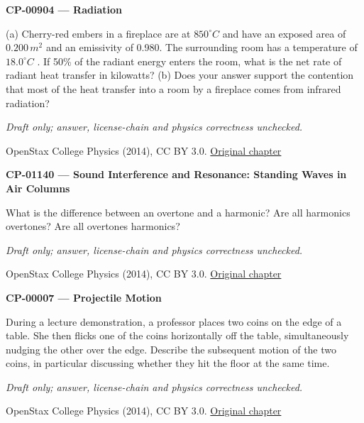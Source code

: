 \par\medskip
\noindent\textbf{CP-00904 — Radiation}
\par (a) Cherry-red embers in a fireplace are at $850^{\circ}C$ and have an exposed area of $0.200\,{m}^{2}$ and an emissivity of 0.980. The surrounding room has a temperature of $18.0^{\circ}C$ . If 50\% of the radiant energy enters the room, what is the net rate of radiant heat transfer in kilowatts? (b) Does your answer support the contention that most of the heat transfer into a room by a fireplace comes from infrared radiation?
\par\smallskip
\textit{Draft only; answer, license-chain and physics correctness unchecked.}
\par{\footnotesize OpenStax College Physics (2014), CC BY 3.0. \href{https://github.com/philschatz/physics-book/blob/a7efaa7e221fab1694022d8bb98b83a73ee31d3d/contents/m42230.md}{Original chapter}}\par\normalsize

\par\medskip
\noindent\textbf{CP-01140 — Sound Interference and Resonance: Standing Waves in Air Columns}
\par What is the difference between an overtone and a harmonic? Are all harmonics overtones? Are all overtones harmonics?
\par\smallskip
\textit{Draft only; answer, license-chain and physics correctness unchecked.}
\par{\footnotesize OpenStax College Physics (2014), CC BY 3.0. \href{https://github.com/philschatz/physics-book/blob/a7efaa7e221fab1694022d8bb98b83a73ee31d3d/contents/m42296.md}{Original chapter}}\par\normalsize

\par\medskip
\noindent\textbf{CP-00007 — Projectile Motion}
\par During a lecture demonstration, a professor places two coins on the edge of a table. She then flicks one of the coins horizontally off the table, simultaneously nudging the other over the edge. Describe the subsequent motion of the two coins, in particular discussing whether they hit the floor at the same time.
\par\smallskip
\textit{Draft only; answer, license-chain and physics correctness unchecked.}
\par{\footnotesize OpenStax College Physics (2014), CC BY 3.0. \href{https://github.com/philschatz/physics-book/blob/a7efaa7e221fab1694022d8bb98b83a73ee31d3d/contents/m42042.md}{Original chapter}}\par\normalsize

